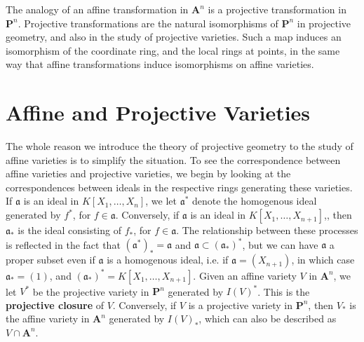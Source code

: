 The analogy of an affine transformation in $\mathbf{A}^n$ is a projective transformation in $\mathbf{P}^n$. Projective transformations are the natural isomorphisms of $\mathbf{P}^n$ in projective geometry, and also in the study of projective varieties. Such a map induces an isomorphism of the coordinate ring, and the local rings at points, in the same way that affine transformations induce isomorphisms on affine varieties.

\section{Affine and Projective Varieties}

The whole reason we introduce the theory of projective geometry to the study of affine varieties is to simplify the situation. To see the correspondence between affine varieties and projective varieties, we begin by looking at the correspondences between ideals in the respective rings generating these varieties. If $\mathfrak{a}$ is an ideal in $K[X_1, \dots, X_n]$, we let $\mathfrak{a}^*$ denote the homogenous ideal generated by $f^*$, for $f \in \mathfrak{a}$. Conversely,  if $\mathfrak{a}$ is an ideal in $K[X_1, \dots, X_{n+1}]$,, then $\mathfrak{a}_*$ is the ideal consisting of $f_*$, for $f \in \mathfrak{a}$. The relationship between these processes is reflected in the fact that $(\mathfrak{a}^*)_* = \mathfrak{a}$ and $\mathfrak{a} \subset (\mathfrak{a}_*)^*$, but we can have $\mathfrak{a}$ a proper subset even if $\mathfrak{a}$ is a homogenous ideal, i.e. if $\mathfrak{a} = (X_{n+1})$, in which case $\mathfrak{a}_* = (1)$, and $(\mathfrak{a}_*)^* = K[X_1, \dots, X_{n+1}]$. Given an affine variety $V$ in $\mathbf{A}^n$, we let $V^*$ be the projective variety in $\mathbf{P}^n$ generated by $I(V)^*$. This is the {\bf projective closure} of $V$. Conversely, if $V$ is a projective variety in $\mathbf{P}^n$, then $V_*$ is the affine variety in $\mathbf{A}^n$ generated by $I(V)_*$, which can also be described as $V \cap \mathbf{A}^n$.

